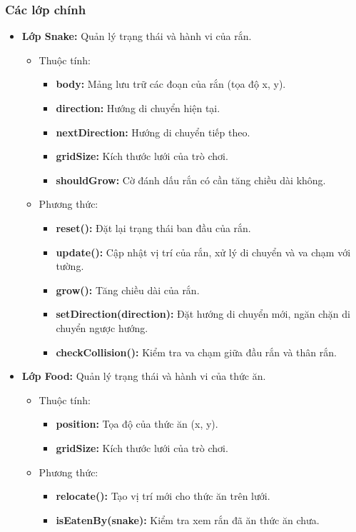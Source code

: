 \documentclass[a4paper, 12pt]{article}
\begin{document}
\subsubsection{Các lớp chính}
\begin{itemize}
    \item \textbf{Lớp Snake:} Quản lý trạng thái và hành vi của rắn.
    \begin{itemize}
        \item Thuộc tính:
        \begin{itemize}
            \item \textbf{body:} Mảng lưu trữ các đoạn của rắn (tọa độ x, y).
            \item \textbf{direction:} Hướng di chuyển hiện tại.
            \item \textbf{nextDirection:} Hướng di chuyển tiếp theo.
            \item \textbf{gridSize:} Kích thước lưới của trò chơi.
            \item \textbf{shouldGrow:} Cờ đánh dấu rắn có cần tăng chiều dài không.
        \end{itemize}
        \item Phương thức:
        \begin{itemize}
            \item \textbf{reset():} Đặt lại trạng thái ban đầu của rắn.
            \item \textbf{update():} Cập nhật vị trí của rắn, xử lý di chuyển và va chạm với tường.
            \item \textbf{grow():} Tăng chiều dài của rắn.
            \item \textbf{setDirection(direction):} Đặt hướng di chuyển mới, ngăn chặn di chuyển ngược hướng.
            \item \textbf{checkCollision():} Kiểm tra va chạm giữa đầu rắn và thân rắn.
        \end{itemize}
    \end{itemize}

    \item \textbf{Lớp Food:} Quản lý trạng thái và hành vi của thức ăn.
    \begin{itemize}
        \item Thuộc tính:
        \begin{itemize}
            \item \textbf{position:} Tọa độ của thức ăn (x, y).
            \item \textbf{gridSize:} Kích thước lưới của trò chơi.
        \end{itemize}
        \item Phương thức:
        \begin{itemize}
            \item \textbf{relocate():} Tạo vị trí mới cho thức ăn trên lưới.
            \item \textbf{isEatenBy(snake):} Kiểm tra xem rắn đã ăn thức ăn chưa.
        \end{itemize}
    \end{itemize}


\end{itemize}
\end{document}
